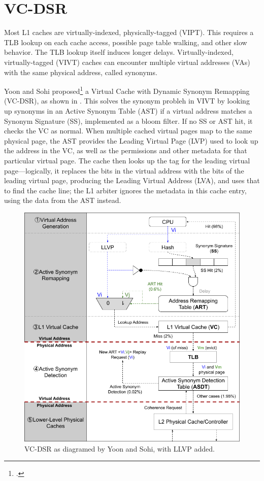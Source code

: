 \section{VC-DSR}

Most L1 caches are virtually-indexed, physically-tagged (VIPT).  This requires
a TLB lookup on each cache access, possible page table walking, and other slow
behavior.  The TLB lookup itself induces longer delays.  Virtually-indexed,
virtually-tagged (VIVT) caches can encounter multiple virtual addresses (VAs)
with the same physical address, called synonyms.

Yoon and Sohi proposed\footcite{Yoon2016} a Virtual Cache with Dynamic Synonym
Remapping (VC-DSR), as shown in .  This solves the
synonym probleh in VIVT by looking up synonyms in an Active Synonym Table (AST)
if a virtual address matches a Synonym Signature (SS), implemented as a bloom
filter.  If no SS or AST hit, it checks the VC as normal.  When multiple cached
virtual pages map to the same physical page, the AST provides the Leading
Virtual Page (LVP) used to look up the address in the VC, as well as the
permissions and other metadata for that particular virtual page.  The cache
then looks up the tag for the leading virtual page—logically, it replaces the
bits in the virtual address with the bits of the leading virtual page,
producing the Leading Virtual Address (LVA), and uses that to find the cache
line; the L1 arbiter ignores the metadata in this cache entry, using the data
from the AST instead.

\begin{figure}[hbpt]
    \centering
    \includegraphics[width=\textwidth]{images/VC-DSR_Cache}
    \caption{\label{fig:VC-DSR}VC-DSR as diagramed by Yoon and Sohi, with LLVP added.}
\end{figure}

